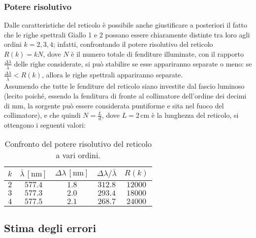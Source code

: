 \documentclass[]{article}
\let\oldsubsection\subsection%
\renewcommand{\subsection}{%
	\renewcommand{\theequation}{\thesubsection.\arabic{equation}}%
	\oldsubsection}%
\begin{document}
    \subsubsection{Potere risolutivo}
    Dalle caratteristiche del reticolo è possibile anche giustificare a posteriori il fatto che le righe spettrali Giallo 1 e 2 possano essere chiaramente distinte tra loro agli ordini $k = 2, 3, 4$; infatti, confrontando il potere risolutivo del reticolo $R(k) = k N$, dove $N$ è il numero totale di fenditure illuminate, con il rapporto $\frac{\Delta\lambda}{\bar{\lambda}}$ delle righe considerate, si può stabilire se esse appariranno separate o meno: se $\frac{\Delta\lambda}{\bar{\lambda}} < R(k)$, allora le righe spettrali appariranno separate.\\
    Assumendo che tutte le fenditure del reticolo siano investite dal fascio luminoso (lecito poiché, essendo la fenditura di fronte al collimatore dell'ordine dei decimi di mm, la sorgente può essere considerata puntiforme e sita nel fuoco del collimatore), e che quindi $N = \frac{L}{d}$, dove $L = 2 \,\text{cm}$ è la lunghezza del reticolo, si ottengono i seguenti valori:
    \begin{table}[H]
        \centering
        \begin{tabular}{||c|c|c|c|c||}
            \hline
            $k$ & $\bar{\lambda} \, \left[\text{nm}\right]$ & $\Delta\lambda \, \left[\text{nm}\right]$ & $\Delta\lambda/\bar{\lambda}$ & $R(k)$ \\
            \hline\hline
            $2$ & $577.4$ & $1.8$ & $312.8$ & $12000$ \\\hline
            $3$ & $577.3$ & $2.0$ & $293.4$ & $18000$ \\\hline
            $4$ & $577.5$ & $2.1$ & $268.7$ & $24000$ \\\hline
        \end{tabular}
        \caption{Confronto del potere risolutivo del reticolo a vari ordini.}
        \label{R}
    \end{table}

    \subsection{Stima degli errori}
\end{document}
